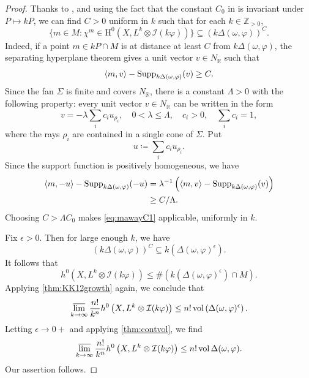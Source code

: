 \begin{proof}
    Thanks to , and using the fact that the constant $C_0$ in  is invariant under $P\mapsto kP$, we can find $C>0$ uniform in $k$ such that for each $k\in \mathbb{Z}_{>0}$,
    \[
    \bigl\{ m\in M:\chi^m\in\mathrm{H}^0(X,L^k\otimes\mathcal{I}(k\varphi))\bigr\}
    \subseteq \left(k\Delta(\omega,\varphi)\right)^C.
    \]
    Indeed, if a point $m\in kP\cap M$ is at distance at least $C$ from $k\Delta(\omega,\varphi)$, the separating hyperplane theorem gives a unit vector $v\in N_{\mathbb R}$ such that
    \[
        \langle m,v\rangle-\operatorname{Supp}_{k\Delta(\omega,\varphi)}(v)\geq C.
    \]
    Since the fan $\Sigma$ is finite and covers $N_{\mathbb R}$, there is a constant $\Lambda>0$ with the following property: every unit vector $v\in N_{\mathbb R}$ can be written in the form
    \[
        v=-\lambda\sum_i c_i u_{\rho_i},\quad 0<\lambda\leq\Lambda,\quad c_i>0,\quad \sum_i c_i=1,
    \]
    where the rays $\rho_i$ are contained in a single cone of $\Sigma$.
    Put
    \[
        u\coloneqq \sum_i c_i u_{\rho_i}.
    \]
    Since the support function is positively homogeneous, we have
    \[
    \begin{aligned}
    \langle m,-u\rangle-\operatorname{Supp}_{k\Delta(\omega,\varphi)}(-u)&=\lambda^{-1}\left(\langle m,v\rangle-\operatorname{Supp}_{k\Delta(\omega,\varphi)}(v)\right)\\
    &\geq C/\Lambda.
    \end{aligned}
    \]
    Choosing $C>\Lambda C_0$ makes \eqref{eq:mawayC1} applicable, uniformly in $k$.

    Fix $\epsilon>0$. Then for large enough $k$, we have
    \[
    \left(k\Delta(\omega,\varphi)\right)^{C}\subseteq k\left(\Delta(\omega,\varphi)^{\epsilon}\right).
    \]
    It follows that
    \[
    h^0\left(X,L^k\otimes \mathcal{I}(k\varphi)\right)\leq \# \left( k\left(\Delta(\omega,\varphi)^{\epsilon}\right) \cap M\right).
    \]
    Applying \cref{thm:KK12growth} again, we conclude that
    \[
    \varlimsup_{k\to\infty} \frac{n!}{k^n} h^0\left(X,L^k\otimes \mathcal{I}(k\varphi)\right)\leq n! \operatorname{vol}\left(\Delta(\omega,\varphi)^{\epsilon}\right).
    \]
    Letting $\epsilon\to 0+$ and applying \cref{thm:contvol}, we find
    \[
    \varlimsup_{k\to\infty} \frac{n!}{k^n} h^0\left(X,L^k\otimes \mathcal{I}(k\varphi)\right)\leq n! \operatorname{vol} \Delta(\omega,\varphi).
    \]
    Our assertion follows.
\end{proof}

